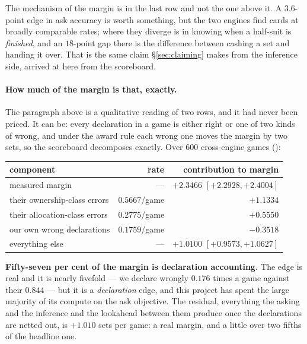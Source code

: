 \documentclass[11pt,a4paper]{article}
\begin{document}
\noindent The mechanism of the margin is in the last row and not the one
above it. A $3.6$-point edge in ask accuracy is worth something, but the two
engines find cards at broadly comparable rates; where they diverge is in
knowing when a half-suit is \emph{finished}, and an $18$-point gap there is
the difference between cashing a set and handing it over. That is the same
claim \S\ref{sec:claiming} makes from the inference side, arrived at here
from the scoreboard.

\paragraph{How much of the margin is that, exactly.}
\label{sec:res-headline} The paragraph above is a
qualitative reading of two rows, and it had never been priced. It can be:
every declaration in a game is either right or one of two kinds of wrong, and
under the award rule each wrong one moves the margin by two sets, so the
scoreboard decomposes exactly. Over $600$ cross-engine games
():

\begin{center}
\small
\begin{tabular}{lrr}
\toprule
component & rate & contribution to margin \\
\midrule
measured margin & --- & $+2.3466$ $[+2.2928, +2.4004]$ \\
their ownership-class errors & $0.5667$/game & $+1.1334$ \\
their allocation-class errors & $0.2775$/game & $+0.5550$ \\
our own wrong declarations & $0.1759$/game & $-0.3518$ \\
\midrule
everything else & --- & $+1.0100$ $[+0.9573, +1.0627]$ \\
\bottomrule
\end{tabular}
\end{center}

\noindent \textbf{Fifty-seven per cent of the margin is declaration
accounting.} The edge is real and it is nearly fivefold --- we declare wrongly
$0.176$ times a game against their $0.844$ --- but it is a \emph{declaration}
edge, and
this project has spent the large majority of its compute on the ask objective.
The residual, everything the asking and the inference and the lookahead
between them produce once the declarations are netted out, is $+1.010$ sets
per game: a real margin, and a little over two fifths of the headline one.
\end{document}
